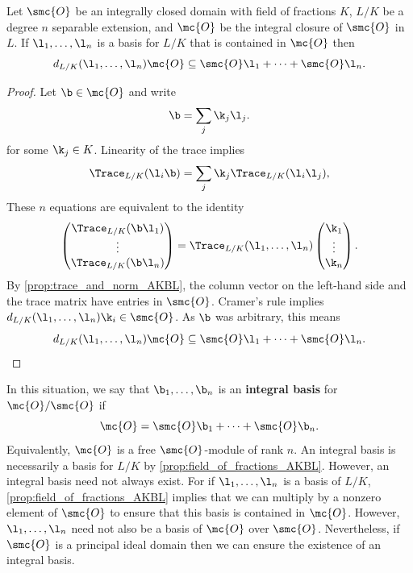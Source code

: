     \begin{lemma}\label{lem:lemma_for_integral_basis_AKBL}
      Let \(\smc{O}\) be an integrally closed domain with field of fractions \(K\), \(L/K\) be a degree \(n\) separable extension, and \(\mc{O}\) be the integral closure of \(\smc{O}\) in \(L\). If \(\l_{1},\ldots,\l_{n}\) is a basis for \(L/K\) that is contained in \(\mc{O}\) then
      \[
        d_{L/K}(\l_{1},\ldots,\l_{n})\mc{O} \subseteq \smc{O}\l_{1}+\cdots+\smc{O}\l_{n}.
      \]
    \end{lemma}
    \begin{proof}
      Let \(\b \in \mc{O}\) and write
      \[
        \b =  \sum_{j}\k_{j}\l_{j}.
      \]
      for some \(\k_{j} \in K\). Linearity of the trace implies
      \[
        \Trace_{L/K}(\l_{i}\b) = \sum_{j}\k_{j}\Trace_{L/K}(\l_{i}\l_{j}),
      \]
      These \(n\) equations are equivalent to the identity
      \[
        \begin{pmatrix} \Trace_{L/K}(\b\l_{1}) \\ \vdots \\ \Trace_{L/K}(\b\l_{n}) \end{pmatrix} = \Trace_{L/K}(\l_{1},\ldots,\l_{n})\begin{pmatrix} \k_{1} \\ \vdots \\ \k_{n} \end{pmatrix}.
      \]
      By \cref{prop:trace_and_norm_AKBL}, the column vector on the left-hand side and the trace matrix have entries in \(\smc{O}\). Cramer's rule implies \(d_{L/K}(\l_{1},\ldots,\l_{n})\k_{i} \in \smc{O}\). As \(\b\) was arbitrary, this means
      \[
        d_{L/K}(\l_{1},\ldots,\l_{n})\mc{O} \subseteq \smc{O}\l_{1}+\cdots+\smc{O}\l_{n}.
      \]
    \end{proof}

    In this situation, we say that \(\b_{1},\ldots,\b_{n}\) is an \textbf{integral basis} for \(\mc{O}/\smc{O}\) if
    \[
      \mc{O} = \smc{O}\b_{1}+\cdots+\smc{O}\b_{n}.
    \]
    Equivalently, \(\mc{O}\) is a free \(\smc{O}\)-module of rank \(n\). An integral basis is necessarily a basis for \(L/K\) by \cref{prop:field_of_fractions_AKBL}. However, an integral basis need not always exist. For if \(\l_{1},\ldots,\l_{n}\) is a basis of \(L/K\), \cref{prop:field_of_fractions_AKBL} implies that we can multiply by a nonzero element of \(\smc{O}\) to ensure that this basis is contained in \(\mc{O}\). However, \(\l_{1},\ldots,\l_{n}\) need not also be a basis of \(\mc{O}\) over \(\smc{O}\). Nevertheless, if \(\smc{O}\) is a principal ideal domain then we can ensure the existence of an integral basis.
    
